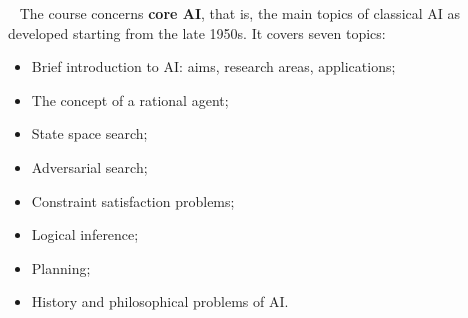 \ \newline
The course concerns \textbf{core AI}, that is, the main topics of classical AI as developed starting from the late
1950s. It covers seven topics:
\begin{itemize}
    \item Brief introduction to AI: aims, research areas, applications;
    \item The concept of a rational agent;
    \item State space search;
    \item Adversarial search;
    \item Constraint satisfaction problems;
    \item Logical inference;
    \item Planning;
    \item History and philosophical problems of AI.
\end{itemize}

